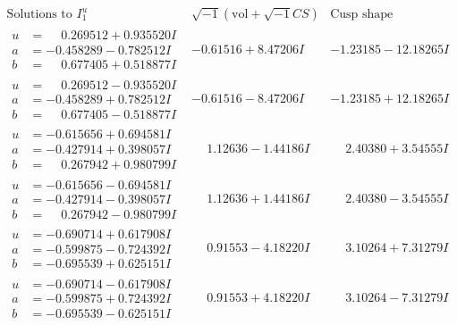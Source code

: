 \documentclass[1p]{elsarticle_modified}
\theoremstyle{definition}
\newcommand{\I}{\sqrt{-1}}
\begin{document}
$$\begin{array}{c|c|c}  
\text{Solutions to }I^u_{1}& \I (\text{vol} + \sqrt{-1}CS) & \text{Cusp shape}\\
 \hline 
\begin{aligned}
u &= \phantom{-}0.269512 + 0.935520 I \\
a &= -0.458289 - 0.782512 I \\
b &= \phantom{-}0.677405 + 0.518877 I\end{aligned}
 & -0.61516 + 8.47206 I & -1.23185 - 12.18265 I \\ \hline\begin{aligned}
u &= \phantom{-}0.269512 - 0.935520 I \\
a &= -0.458289 + 0.782512 I \\
b &= \phantom{-}0.677405 - 0.518877 I\end{aligned}
 & -0.61516 - 8.47206 I & -1.23185 + 12.18265 I \\ \hline\begin{aligned}
u &= -0.615656 + 0.694581 I \\
a &= -0.427914 + 0.398057 I \\
b &= \phantom{-}0.267942 + 0.980799 I\end{aligned}
 & \phantom{-}1.12636 - 1.44186 I & \phantom{-}2.40380 + 3.54555 I \\ \hline\begin{aligned}
u &= -0.615656 - 0.694581 I \\
a &= -0.427914 - 0.398057 I \\
b &= \phantom{-}0.267942 - 0.980799 I\end{aligned}
 & \phantom{-}1.12636 + 1.44186 I & \phantom{-}2.40380 - 3.54555 I \\ \hline\begin{aligned}
u &= -0.690714 + 0.617908 I \\
a &= -0.599875 - 0.724392 I \\
b &= -0.695539 + 0.625151 I\end{aligned}
 & \phantom{-}0.91553 - 4.18220 I & \phantom{-}3.10264 + 7.31279 I \\ \hline\begin{aligned}
u &= -0.690714 - 0.617908 I \\
a &= -0.599875 + 0.724392 I \\
b &= -0.695539 - 0.625151 I\end{aligned}
 & \phantom{-}0.91553 + 4.18220 I & \phantom{-}3.10264 - 7.31279 I \\ \hline\begin{aligned}

\end{aligned}
\end{array}$$
\end{document}
